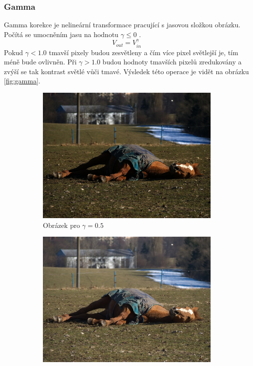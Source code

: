 \documentclass[11pt, a4paper, titlepage]{article}
\begin{document}
\subsubsection{Gamma}
Gamma korekce je nelineární transformace pracující s jasovou složkou obrázku.
Počítá se umocněním jasu na hodnotu $\gamma \leq 0$ \cite{wiki:Gamma_correction}.
$$V_{out}=V_{in}^\gamma$$
Pokud $\gamma < 1.0$ tmavší pixely budou zesvětleny a čím více pixel světlejší je, tím méně bude ovlivněn.
Při $\gamma > 1.0$ budou hodnoty tmavších pixelů zredukovány a zvýší se tak kontrast světlé vůči tmavé.
Výsledek této operace je vidět na obrázku \ref{fig:gamma}.
\begin{figure}[h]
    \centering
    \begin{subfigure}[t]{0.25\textwidth}
        \vskip 0pt
        \includegraphics[width=1.0\textwidth]{horse_gamma_minus.jpg}
        \caption{Obrázek pro $\gamma = 0.5$}
    \end{subfigure}
    \hspace{1cm}
    \begin{subfigure}[t]{0.25\textwidth}
        \vskip 0pt
        \includegraphics[width=1.0\textwidth]{horse_original.jpg}

\end{subfigure}
\end{figure}
\end{document}
